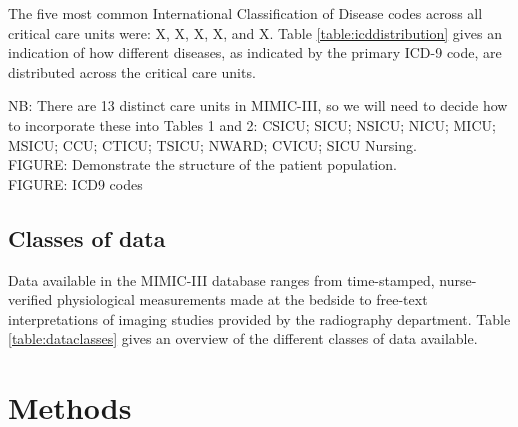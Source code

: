 \documentclass[english]{article}
\begin{document}
The five most common International Classification of Disease codes across all critical care units were: X, X, X, X, and X. Table \ref{table:icddistribution} gives an indication of how different diseases, as indicated by the primary ICD-9 code, are distributed across the critical care units. 

NB: There are 13 distinct care units in MIMIC-III, so we will need to decide how to incorporate these into Tables 1 and 2: CSICU; SICU; NSICU; NICU; MICU; MSICU; CCU; CTICU; TSICU; NWARD; CVICU; SICU Nursing. \\

FIGURE: Demonstrate the structure of the patient population. \\

FIGURE: ICD9 codes \\




\subsection*{Classes of data}

Data available in the MIMIC-III database ranges from time-stamped, nurse-verified physiological measurements made at the bedside to free-text interpretations of imaging studies provided by the radiography department. Table \ref{table:dataclasses} gives an overview of the different classes of data available. 

\section*{Methods}

\end{document}
